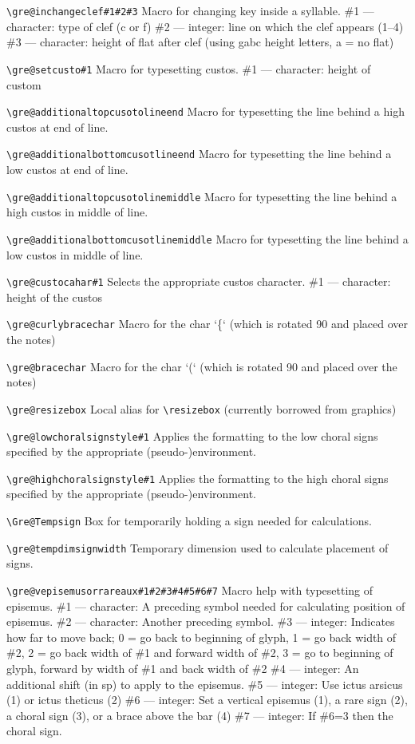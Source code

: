 \verb=\gre@inchangeclef#1#2#3=%
	Macro for changing key inside a syllable.
	\#1 --- character: type of clef (c or f)
	\#2 --- integer: line on which the clef appears (1--4)
	\#3 --- character: height of flat after clef (using gabc height letters, a = no flat)

\verb=\gre@setcusto#1=%
	Macro for typesetting custos.
	\#1 --- character: height of custom

\verb=\gre@additionaltopcusotolineend=%
	Macro for typesetting the line behind a high custos at end of line.

\verb=\gre@additionalbottomcusotlineend=%
	Macro for typesetting the line behind a low custos at end of line.

\verb=\gre@additionaltopcusotolinemiddle=%
	Macro for typesetting the line behind a high custos in middle of line.

\verb=\gre@additionalbottomcusotlinemiddle=%
	Macro for typesetting the line behind a low custos in middle of line.

\verb=\gre@custocahar#1=%
	Selects the appropriate custos character.
	\#1 --- character: height of the custos

\verb=\gre@curlybracechar=%
	Macro for the char ‘\{‘ (which is rotated 90 and placed over the notes)

\verb=\gre@bracechar=%
	Macro for the char ‘(‘ (which is rotated 90 and placed over the notes)

\verb=\gre@resizebox=%
	Local alias for \verb=\resizebox= (currently borrowed from graphics)

\verb=\gre@lowchoralsignstyle#1=%
	Applies the formatting to the low choral signs specified by the appropriate (pseudo-)environment.

\verb=\gre@highchoralsignstyle#1=%
	Applies the formatting to the high choral signs specified by the appropriate (pseudo-)environment.

\verb=\Gre@Tempsign=%
	Box for temporarily holding a sign needed for calculations.

\verb=\gre@tempdimsignwidth=%
	Temporary dimension used to calculate placement of signs.

\verb=\gre@vepisemusorrareaux#1#2#3#4#5#6#7=%
	Macro help with typesetting of episemus.
	\#1 --- character: A preceding symbol needed for calculating position of episemus.
	\#2 --- character: Another preceding symbol.
	\#3 --- integer: Indicates how far to move back; 0 = go back to beginning of glyph, 1 = go back width of \#2, 2 = go back width of \#1 and forward width of \#2, 3 = go to beginning of glyph, forward by width of \#1 and back width of \#2
	\#4 --- integer: An additional shift (in sp) to apply to the episemus.
	\#5 --- integer: Use ictus arsicus (1) or ictus theticus (2)
	\#6 --- integer: Set a vertical episemus (1), a rare sign (2), a choral sign (3), or a brace above the bar (4)
	\#7 --- integer: If \#6=3 then the choral sign.

